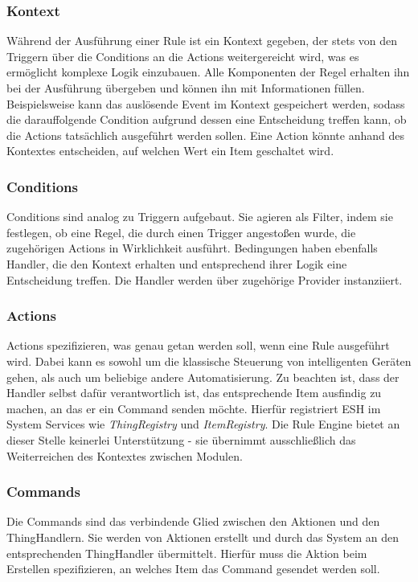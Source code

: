 \subsubsection{Kontext}
\label{subsubsec:kontext}
Während der Ausführung einer Rule ist ein Kontext gegeben, der stets von den Triggern über die Conditions an die Actions weitergereicht wird, was es ermöglicht komplexe Logik einzubauen. Alle Komponenten der Regel erhalten ihn bei der Ausführung übergeben und können ihn mit Informationen füllen. Beispielsweise kann das auslösende Event im Kontext gespeichert werden, sodass die darauffolgende Condition aufgrund dessen eine Entscheidung treffen kann, ob die Actions tatsächlich ausgeführt werden sollen. Eine Action könnte anhand des Kontextes entscheiden, auf welchen Wert ein Item geschaltet wird.

\subsubsection{Conditions}
Conditions sind analog zu Triggern aufgebaut. Sie agieren als Filter, indem sie festlegen, ob eine Regel, die durch einen Trigger angestoßen wurde, die zugehörigen Actions in Wirklichkeit ausführt. Bedingungen haben ebenfalls Handler, die den Kontext erhalten und entsprechend ihrer Logik eine Entscheidung treffen. Die Handler werden über zugehörige Provider instanziiert.

\subsubsection{Actions}
Actions spezifizieren, was genau getan werden soll, wenn eine Rule ausgeführt wird. Dabei kann es sowohl um die klassische Steuerung von intelligenten Geräten gehen, als auch um beliebige andere Automatisierung. Zu beachten ist, dass der Handler selbst dafür verantwortlich ist, das entsprechende Item ausfindig zu machen, an das er ein Command senden möchte. Hierfür registriert ESH im System Services wie \textit{ThingRegistry} und \textit{ItemRegistry}. Die Rule Engine bietet an dieser Stelle keinerlei Unterstützung - sie übernimmt ausschließlich das Weiterreichen des Kontextes zwischen Modulen.


\subsubsection{Commands}
Die Commands sind das verbindende Glied zwischen den Aktionen und den ThingHandlern. Sie werden von Aktionen erstellt und durch das System an den entsprechenden ThingHandler übermittelt. Hierfür muss die Aktion beim Erstellen spezifizieren, an welches Item das Command gesendet werden soll. 


